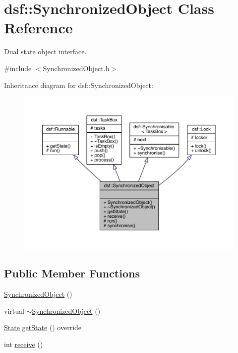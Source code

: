 \hypertarget{classdsf_1_1_synchronized_object}{}\section{dsf\+:\+:Synchronized\+Object Class Reference}
\label{classdsf_1_1_synchronized_object}


Dual state object interface.  




{\ttfamily \#include $<$Synchronized\+Object.\+h$>$}



Inheritance diagram for dsf\+:\+:Synchronized\+Object\+:\nopagebreak
\begin{figure}[H]
\begin{center}
\leavevmode
\includegraphics[width=350pt]{classdsf_1_1_synchronized_object__inherit__graph}
\end{center}
\end{figure}
\subsection*{Public Member Functions}
\begin{DoxyCompactItemize}
\item 
\hyperlink{classdsf_1_1_synchronized_object_a3f1d2def677e6d814de4d0bd2aa3d95b}{Synchronized\+Object} ()
\item 
virtual \hyperlink{classdsf_1_1_synchronized_object_ac7e50befb4b96229443037be154f1368}{$\sim$\+Synchronized\+Object} ()
\item 
\hyperlink{classdsf_1_1_runnable_a8eb63b21a0accc7a6a2a05f18e257991}{State} \hyperlink{classdsf_1_1_synchronized_object_a744c49c3f58728492b97a167e2d83d02}{get\+State} () override
\item 
int \hyperlink{classdsf_1_1_synchronized_object_a3ce496c6aaecc4b0ca3a4d09539a4920}{receive} ()
\end{DoxyCompactItemize}
